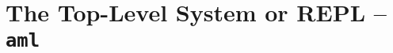 
\chapter[The Top-Level System or REPL -- aml]{The Top-Level System or REPL -- \lstinline!aml!}
\label{ch:tools-aml}








